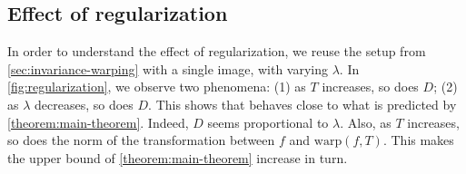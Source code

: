 \subsection{Effect of regularization}\label{sec:regularization}
In order to understand the effect of regularization, we reuse the setup from \cref{sec:invariance-warping} with a single image, with varying $\lambda$. In \cref{fig:regularization}, we observe two phenomena: (1) as $T$ increases, so does $D$; (2) as $\lambda$ decreases, so does $D$. This shows that \Diffy behaves close to what is predicted by \cref{theorem:main-theorem}. Indeed, $D$ seems proportional to $\lambda$. Also, as $T$ increases, so does the norm of the transformation between $f$ and $\text{warp}(f, T)$. This makes the upper bound of \cref{theorem:main-theorem} increase in turn.
